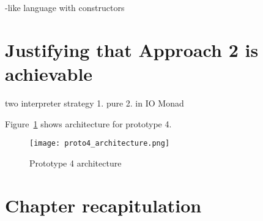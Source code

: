 \documentclass[thesis-solanki.tex]{subfiles}
\begin{document}
\begin{code-list}[H]
\begin{singlespace}
  \inputminted[linenos, firstline=7, lastline=16]{haskell}{haskell-proto4-platen-winkel.hs}
\end{singlespace}
\caption{-like language with  constructors}
\label{tab:prologresultdatatype}
\end{code-list}

\section{Justifying that Approach 2 is achievable}
two interpreter strategy
1. pure
2. in IO Monad

Figure~\ref{fig:proto4architecture} shows architecture for prototype 4.

\begin{figure}[H]
  \centering
  \texttt{[image: proto4\_architecture.png]}
  \caption{Prototype 4 architecture}
  \label{fig:proto4architecture}
\end{figure}



\section{Chapter recapitulation}

\ifMain\ifDraft
\begin{scope}
  \nolinenumbers
  \enotesize
  \par
  \begin{singlespace}
  \setlength{\parskip}{12pt plus 2pt minus 1pt}
  \theendnotes
  \par
  \end{singlespace}
\end{scope}
\fi\fi
\end{document}
